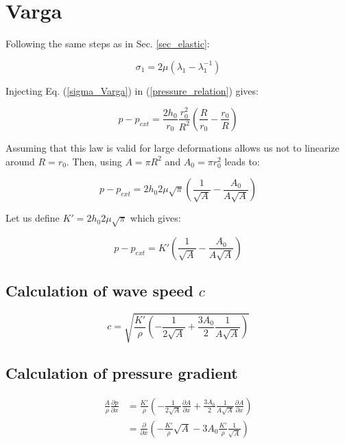 \documentclass{config}
\begin{document}
\section{Varga}\label{sec_Varga}

Following the same steps as in Sec. \ref{sec_elastic}:

\begin{equation}\label{sigma_Varga}
\sigma_1 = 2 \mu (\lambda_1 - \lambda_1^{-1})
\end{equation}

Injecting Eq. (\ref{sigma_Varga}) in (\ref{pressure_relation}) gives:

\begin{equation}
p - p _{ext} = \frac{2 h_0}{r_0} \frac{r_0^2}{R^2 }\left(\frac{R}{r_0} - \frac{r_0}{R}\right)
\end{equation}

Assuming that this law is valid for large deformations allows us not to linearize around $R=r_0$. Then, using $A = \pi R^2$  and $A_0 = \pi r_0^2$ leads to:

\begin{equation}\label{p_final}
p - p_{ext} = 2 h_0 2 \mu \sqrt{\pi} \left( \frac{1}{\sqrt{A}} - \frac{A_0}{A \sqrt{A}}\right)
\end{equation}

Let us define $K' = \displaystyle 2 h_0 2 \mu \sqrt{\pi}$ which gives: 

\begin{equation}\label{pressure_varga}
p-p_{ext} = K' \left(\frac{1}{\sqrt{A}} - \frac{A_0}{A \sqrt{A}}\right)
\end{equation}

\subsection{Calculation of wave speed $c$}

\begin{equation}
c = \sqrt{\frac{K'}{\rho} \left(- \frac{1}{2 \sqrt{A} }+ \frac{3 A_0}{2} \frac{1}{A \sqrt{A}} \right)}
\end{equation}

\subsection{Calculation of pressure gradient }

\begin{align}
\displaystyle \frac{A}{\rho} \frac{\partial p}{\partial x} & =  \frac{K'}{\rho} \left(- \frac{1}{2 \sqrt{A} }\frac{\partial A}{\partial x}+ \frac{3 A_0}{2} \frac{1}{A \sqrt{A}} \frac{\partial A}{\partial x}\right) \\ 
&  = \frac{\partial }{\partial x}\left(- \frac{K'}{\rho} \sqrt{A} - 3 A_0\frac{K'}{\rho} \frac{1}{\sqrt{A}} \right)
\end{align}
\end{document}
